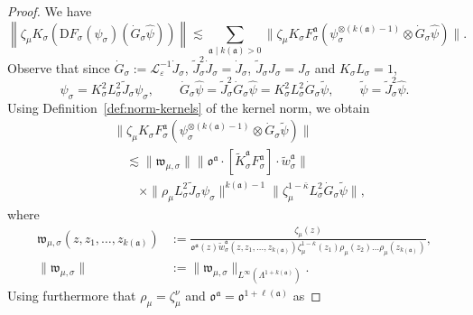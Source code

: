 \documentclass{article}
\numberwithin{equation}{section}
\newcommand{\assign}{:=}
\newcommand{\mathD}{\mathrm{D}}
\theoremstyle{plain}
\theoremstyle{definition}
\begin{document}
\begin{proof}
  We have
  \[ \left\| \zeta_{\mu} K_{\sigma} \left( {\mathD F_{\sigma}} 
     (\psi_{\sigma}) (\dot{G}_{\sigma} \hat{\psi}) \right) \right\| \lesssim
     \sum_{\mathfrak{a} \mid k (\mathfrak{a}) > 0} \| \zeta_{\mu}
     K_{\sigma} F_{\sigma}^{\mathfrak{a}} (\psi_{\sigma}^{\otimes (k
     (\mathfrak{a}) - 1)} \otimes \dot{G}_{\sigma} \hat{\psi}) \| . \]
  Observe that since $\dot{G}_{\sigma} \assign \mathcal{L}^{- 1}_{\varepsilon}
  \dot{J}_{\sigma}$, $\tilde{J}_{\sigma}^2 \dot{J}_{\sigma}  =
  \dot{J}_{\sigma} $, $\tilde{J}_{\sigma} J_{\sigma}  = J_{\sigma}$ and
  $K_{\sigma} L_{\sigma} = 1$,
  \[ \psi_{\sigma} = K_{\sigma}^2 L_{\sigma}^2 \tilde{J}_{\sigma}
     \psi_{\sigma}, \qquad \dot{G}_{\sigma} \hat{\psi} = \tilde{J}_{\sigma}^2
     \dot{G}_{\sigma} \hat{\psi} = K_{\sigma}^2 L_{\sigma}^2 \dot{G}_{\sigma}
     \tilde{\psi}, \qquad \tilde{\psi} = \tilde{J }_{\sigma}^2 \hat{\psi}
     . \]
  Using Definition~\ref{def:norm-kernels} of the kernel norm, we obtain
  \begin{align*}
    &\| \zeta_{\mu} K_{\sigma} F_{\sigma}^{\mathfrak{a}}
    (\psi_{\sigma}^{\otimes (k(\mathfrak{a}) - 1)}
    \otimes \dot{G}_{\sigma}\tilde{\psi}) \|\\
    &\quad \lesssim
    \| \mathfrak{w}_{\mu, \sigma} \|
    \| \mathfrak{o}^{\mathfrak{a}}
    \cdot [\tilde{K}_{\sigma}^{\mathfrak{a}}F_{\sigma}^{\mathfrak{a}}]
    \cdot \tilde{w}_{\sigma}^{\mathfrak{a}} \|\\
    &\qquad \times
    \| \rho_{\mu} L^2_{\sigma} \tilde{J}_{\sigma} \psi_{\sigma}
    \|^{k(\mathfrak{a}) - 1}
    \| \zeta_{\mu}^{1 - \bar{\kappa}} L_{\sigma}^2
    \dot{G}_{\sigma} \tilde{\psi} \|,
  \end{align*}
  where
  \begin{align*}
    \mathfrak{w}_{\mu, \sigma} \left( z, z_1 {, \ldots, z_{k
     (\mathfrak{a})}}  \right)
     &\assign \frac{\zeta_{\mu} (z)}
     {\mathfrak{o}^{\mathfrak{a}} (z)  \tilde{w}_{\sigma}^{\mathfrak{a}}
     \left( z, z_1 {, \ldots, z_{k (\mathfrak{a})}}  \right) \zeta_{\mu}^{1 -
     \bar{\kappa}} (z_1) \rho _{\mu} (z_2) \ldots \rho _{\mu} (z_{k
     (\mathfrak{a})})},\\
    \| \mathfrak{w}_{\mu, \sigma} \|
     &\assign \| \mathfrak{w}_{\mu, \sigma} \|_{L^{\infty} (\Lambda^{1 + k
     (\mathfrak{a})})} .
  \end{align*}
  Using furthermore that $\rho_{\mu} = \zeta_{\mu}^{\nu}$ and
  $\mathfrak{o}^{\mathfrak{a}} =\mathfrak{o}^{1 + \ell (\mathfrak{a})}$ as

\end{proof}
\end{document}
